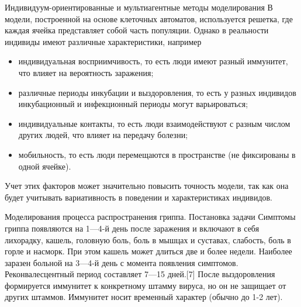 \documentclass[notheorems]{beamer}
\begin{document}
\begin{frame}
	{Индивидуум-ориентированные и мультиагентные методы моделирования}
	В модели, построенной на основе клеточных автоматов, используется решетка, где каждая ячейка представляет собой часть популяции. Однако в реальности индивиды имеют различные характеристики, например
	\begin{itemize}
		\item индивидуальная восприимчивость, то есть люди имеют разный иммунитет, что влияет на вероятность заражения;
		\item различные периоды инкубации и выздоровления, то есть у разных индивидов инкубационный и инфекционный периоды могут варьироваться;
		\item индивидуальные контакты, то есть люди взаимодействуют с разным числом других людей, что влияет на передачу болезни;
		\item мобильность, то есть люди перемещаются в пространстве (не фиксированы в одной ячейке).
	\end{itemize}
	
	Учет этих факторов может значительно повысить точность модели, так как она будет учитывать вариативность в поведении и характеристиках индивидов.
\end{frame}

\begin{frame}
	{Моделирования процесса распространения гриппа. Постановка задачи
	}
	Симптомы гриппа появляются на 1—4-й день после заражения и включают в себя лихорадку, кашель, головную боль, боль в мышцах и суставах, слабость, боль в горле и насморк. При этом кашель может длиться две и более недели. Наиболее заразен больной на 3—4-й день с момента появления симптомов. Реконвалесцентный период составляет 7—15 дней.[7] После выздоровления формируется иммунитет к конкретному штамму вируса, но он не защищает от других штаммов. Иммунитет носит временный характер (обычно до 1-2 лет).
\end{frame}
\end{document}
